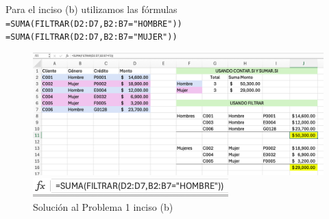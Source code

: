 \documentclass{article}
\begin{document}
\noindent
Para el inciso (b) utilizamos las fórmulas
\\[12pt]
\texttt{=SUMA(FILTRAR(D2:D7,B2:B7="HOMBRE"))}
\\[0pt]
\texttt{=SUMA(FILTRAR(D2:D7,B2:B7="MUJER"))}
\begin{figure}[!ht]
    \centering
    \begin{minipage}{\textwidth}
        \centering
        \includegraphics[width=\textwidth]{figures/s101-1b1.png}
    \end{minipage}
    \hfill
    \begin{minipage}{\textwidth}
        \centering
        \includegraphics[width=\textwidth]{figures/s101-1b2.png}
    \end{minipage}
    \captionsetup{width=0.9\textwidth}
    \caption{Solución al Problema 1 inciso (b)}
    \label{fig:s101-1b}
\end{figure}
\end{document}
